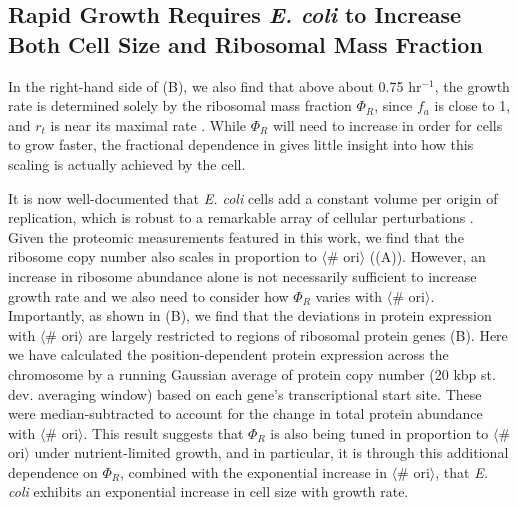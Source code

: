 \subsection{Rapid Growth Requires \textit{E. coli} to Increase Both Cell Size and Ribosomal
Mass Fraction}
In the right-hand side of (B),  we also find that above about 0.75
hr$^{-1}$, the growth rate is determined solely by the ribosomal mass fraction
$\Phi_R$, since $f_a$ is close to 1, and $r_t$ is near its maximal rate
\citep{dai2016}. While $\Phi_R$ will need to increase in order for cells to
grow faster, the fractional dependence in 
gives little insight into how this scaling is actually achieved by the cell.

It is now well-documented that \textit{E. coli} cells add a constant volume per
origin of replication, which is robust to a remarkable array of cellular
perturbations \citep{si2017}. Given the proteomic measurements featured in this
work, we find that the ribosome copy number also scales in proportion to
$\langle$\# ori$\rangle$ ((A)). However,  an
increase in ribosome abundance alone is not necessarily sufficient to increase
growth rate and  we also need to consider how $\Phi_R$ varies with $\langle$\#
ori$\rangle$. Importantly, as shown in (B), we find
that the deviations in protein expression with $\langle$\# ori$\rangle$ are
largely restricted to regions of ribosomal protein genes
(B). Here we have calculated the position-dependent
protein expression across the chromosome by a running Gaussian average of
protein copy number (20 kbp st. dev. averaging window) based on each gene's
transcriptional start site. These were median-subtracted to account for the
change in total protein abundance with $\langle$\# ori$\rangle$. This result
suggests that $\Phi_R$ is also being tuned in proportion to $\langle$\#
ori$\rangle$ under nutrient-limited growth, and in particular, it is through
this additional dependence on $\Phi_R$, combined with the exponential increase
in $\langle$\# ori$\rangle$, that \textit{E. coli} exhibits an exponential
increase in cell size with growth rate.


